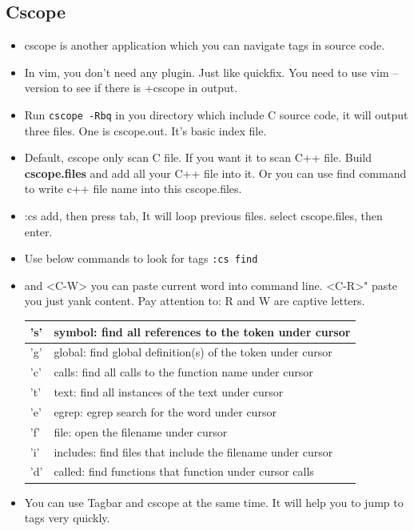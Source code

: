 \documentclass[a4paper,12pt,twoside]{book}
\begin{document}
\begin{itemize}
\begin{itemize}
\subsection{Cscope}
\begin{itemize}

\item cscope is another application which you can navigate tags in source code. 
\item In vim, you don't need any plugin. Just like quickfix. You need to use vim --version to see if there is +cscope in output. 

\item Run \verb=cscope -Rbq= in you directory which include C source code, it will output three files. One is cscope.out. It's basic index file. 

\item Default, cscope only scan C file. If you want it to scan C++ file. Build \textbf{cscope.files} and add all your C++ file into it. Or you can use find command to write c++ file name into this cscope.files.

\item :cs add, then press tab, It will loop previous files. select cscope.files, then enter.

\item Use below commands to look for tags \verb=:cs find= 
\item <C-R> and <C-W> you can paste current word into command line. <C-R>" paste you just yank content. Pay attention to: R and W are captive letters.
  
\begin{tabular}{p{}|p{}}
\hline 
's'  & symbol: find all references to the token under cursor \\
\hline 
'g'  & global: find global definition(s) of the token under cursor \\
\hline 
'c'  & calls:  find all calls to the function name under cursor \\
\hline 
't'  & text:   find all instances of the text under cursor \\
\hline 
'e'  & egrep:  egrep search for the word under cursor \\
\hline 
'f'  & file:   open the filename under cursor \\
\hline 
'i'  & includes: find files that include the filename under cursor \\
\hline 
'd' &  called: find functions that function under cursor calls \\
\hline
\end{tabular}
\item You can use Tagbar and cscope at the same time. It will help you to jump to tags very quickly. 	
\end{itemize}


\end{itemize}
\end{itemize}
\end{document}
